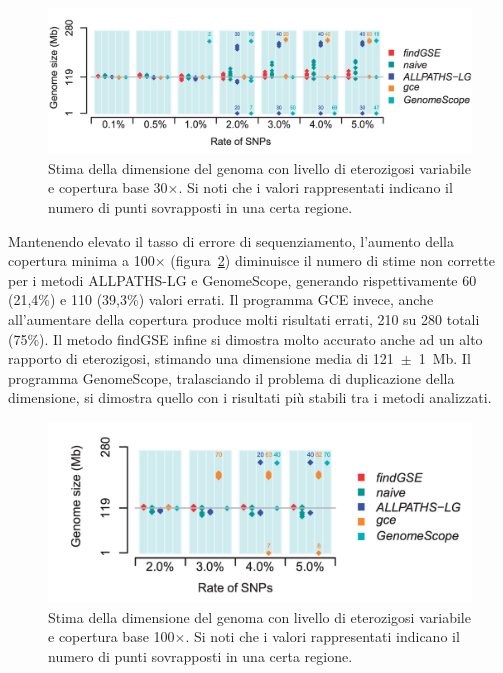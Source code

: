 \documentclass[crop=false, class=book]{standalone}
\begin{document}
 	\begin{figure}
 		\centering
 		\includegraphics[height=0.21\textheight]{capitoli/analisi/confronto/confronto1/d.png}
 		\caption{Stima della dimensione del genoma con livello di eterozigosi variabile e copertura base 30$\times$. Si noti che i valori rappresentati indicano il numero di punti sovrapposti in una certa regione.}
 		\label{fig:confronto3}
 	\end{figure}
 
 	Mantenendo elevato il tasso di errore di sequenziamento, l'aumento della copertura minima a 100$\times$ (figura~\ref{fig:confronto4}) diminuisce il numero di stime non corrette per i metodi ALLPATHS-LG e GenomeScope, generando rispettivamente 60 (21,4\%) e 110 (39,3\%) valori errati. 
 	Il programma GCE invece, anche all'aumentare della copertura produce molti risultati errati, 210 su 280 totali (75\%).
 	Il metodo findGSE infine si dimostra molto accurato anche ad un alto rapporto di eterozigosi, stimando una dimensione media di \mbox{121 $\pm$ 1 Mb}. 
 	Il programma GenomeScope, tralasciando il problema di duplicazione della dimensione, si dimostra quello con i risultati più stabili tra i  metodi analizzati.
 	
	 \begin{figure} 
	 	\centering
	 	\includegraphics[height=0.21\textheight]{capitoli/analisi/confronto/confronto1/e.png}
	 	\caption{Stima della dimensione del genoma con livello di eterozigosi variabile e copertura base 100$\times$. Si noti che i valori rappresentati indicano il numero di punti sovrapposti in una certa regione.}
	 	\label{fig:confronto4}
	 \end{figure}
 
\end{document}
